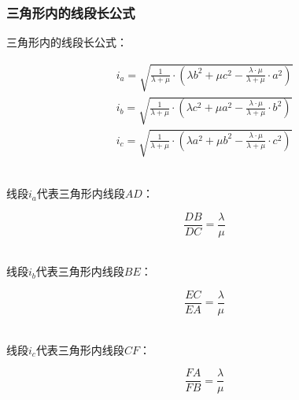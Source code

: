 \documentclass[UTF8]{ctexart}
\begin{document}
\subsubsection{三角形内的线段长公式}
    三角形内的线段长公式：
    \begin{large}
        \begin{align*}
            i_a=\sqrt{\frac{1}{\lambda+\mu}\cdot\left(\lambda b^2+\mu c^2-\frac{\lambda\cdot \mu}{\lambda +\mu}\cdot a^2\right)}\\[5mm]
            i_b=\sqrt{\frac{1}{\lambda+\mu}\cdot\left(\lambda c^2+\mu a^2-\frac{\lambda\cdot \mu}{\lambda +\mu}\cdot b^2\right)}\\[5mm]
            i_c=\sqrt{\frac{1}{\lambda+\mu}\cdot\left(\lambda a^2+\mu b^2-\frac{\lambda\cdot \mu}{\lambda +\mu}\cdot c^2\right)}
        \end{align*}
    \end{large}\\
    线段$i_a$代表三角形内线段$AD$：
    \begin{large}
        \begin{equation*}
            \frac{DB}{DC}=\frac{\lambda}{\mu}
        \end{equation*}
    \end{large}\\
    线段$i_b$代表三角形内线段$BE$：
    \begin{large}
        \begin{equation*}
            \frac{EC}{EA}=\frac{\lambda}{\mu}
        \end{equation*}
    \end{large}\\
    线段$i_c$代表三角形内线段$CF$：
    \begin{large}
        \begin{equation*}
            \frac{FA}{FB}=\frac{\lambda}{\mu}
        \end{equation*}
    \end{large}\\
\end{document}
